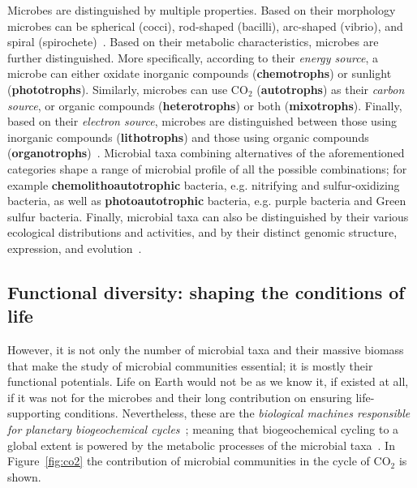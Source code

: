       Microbes are distinguished by multiple properties.
      Based on their morphology microbes can be spherical (cocci), rod-shaped (bacilli),
      arc-shaped (vibrio), and spiral (spirochete)~\citep{dunlap2001microbial}.
      Based on their metabolic characteristics, microbes are further distinguished. 
      More specifically, according to their \textit{energy source}, 
      a microbe can either oxidate inorganic compounds (\textbf{chemotrophs}) 
      or sunlight (\textbf{phototrophs}).
      Similarly, microbes can use CO$_2$ (\textbf{autotrophs}) as their \textit{carbon source},
      or organic compounds (\textbf{heterotrophs}) or both (\textbf{mixotrophs}).
      Finally, based on their \textit{electron source}, 
      microbes are distinguished between those using inorganic compounds (\textbf{lithotrophs}) and those using organic compounds (\textbf{organotrophs})~\citep{madigan2018brock}.
      Microbial taxa combining alternatives of the aforementioned categories 
      shape a range of microbial profile of all the possible combinations; for example      \textbf{chemolithoautotrophic} bacteria, 
      e.g. nitrifying and sulfur-oxidizing bacteria, as well
      as \textbf{photoautotrophic} bacteria, 
      e.g. purple bacteria and Green sulfur bacteria. 
      Finally, microbial taxa can also be distinguished by their various ecological distributions and activities, 
      and by their distinct genomic structure, expression, and evolution~\citep{dunlap2001microbial}. 

   \subsection{Functional diversity: shaping the conditions of life}
   \label{subsec:functional_diversity}

      However, it is not only the number of microbial taxa and their massive biomass that
      make the study of microbial communities essential; 
      it is mostly their functional potentials. 
      Life on Earth would not be as we know it, if existed at all, if it was not for the 
      microbes and their long contribution on ensuring life-supporting conditions. 
      Nevertheless, these are the \textit{biological machines responsible for planetary
      biogeochemical cycles}~\citep{falkowski2008microbial}; meaning that biogeochemical cycling 
      to a global extent
      is powered by the metabolic processes of the microbial taxa~\citep{louca2016decoupling}. 
      In Figure~\ref{fig:co2} the contribution of microbial communities 
      in the cycle of CO$_2$ is shown. 

